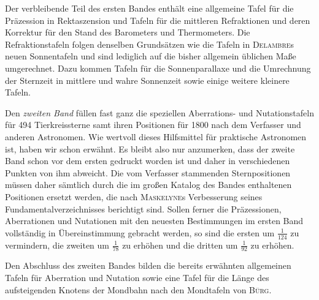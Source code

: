 Der verbleibende Teil des ersten Bandes enthält eine allgemeine Tafel für die Präzession in Rektaszension und Tafeln für die mittleren Refraktionen und deren Korrektur für den Stand des Barometers und Thermometers. Die Refraktionstafeln folgen denselben Grundsätzen wie die Tafeln in \textsc{Delambre}s neuen Sonnentafeln und sind lediglich auf die bisher allgemein üblichen Maße umgerechnet. Dazu kommen Tafeln für die Sonnenparallaxe und die Umrechnung der Sternzeit in mittlere und wahre Sonnenzeit sowie einige weitere kleinere Tafeln.

Den \emph{zweiten Band} füllen fast ganz die speziellen Aberrations- und Nutationstafeln für 494 Tierkreissterne samt ihren Positionen für 1800 nach dem Verfasser und anderen Astronomen. Wie wertvoll dieses Hilfsmittel für praktische Astronomen ist, haben wir schon erwähnt. Es bleibt also nur anzumerken, dass der zweite Band schon vor dem ersten gedruckt worden ist und daher in verschiedenen Punkten von ihm abweicht. Die vom Verfasser stammenden Sternpositionen müssen daher sämtlich durch die im großen Katalog des Bandes enthaltenen Positionen ersetzt werden, die nach \textsc{Maskelyne}s Verbesserung seines Fundamentalverzeichnisses berichtigt sind. Sollen ferner die Präzessionen, Aberrationen und Nutationen mit den neuesten Bestimmungen im ersten Band vollständig in Übereinstimmung gebracht werden, so sind die ersten um $\frac{1}{124}$ zu vermindern, die zweiten um $\frac{1}{78}$ zu erhöhen und die dritten um $\frac{1}{92}$ zu erhöhen.

Den Abschluss des zweiten Bandes bilden die bereits erwähnten allgemeinen Tafeln für Aberration und Nutation sowie eine Tafel für die Länge des aufsteigenden Knotens der Mondbahn nach den Mondtafeln von \textsc{Bürg}.
